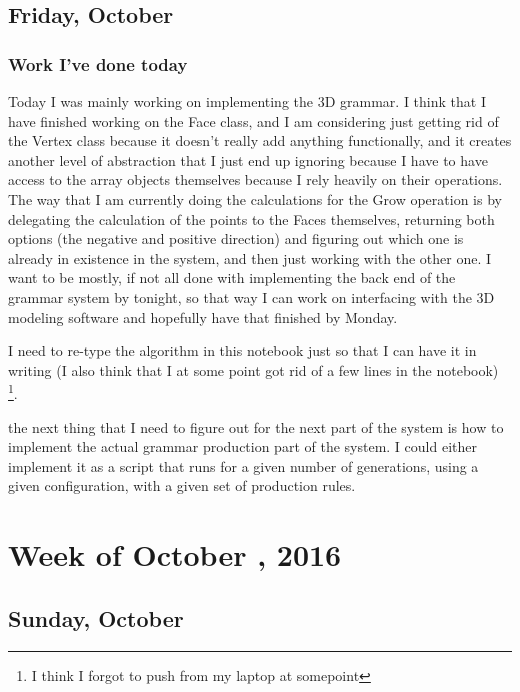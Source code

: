 \documentclass[letterpaper,oneside,titlepage]{article}
\begin{document}
\subsection{Friday, October }

\subsubsection{Work I've done today}
Today I was mainly working on implementing the 3D grammar.  I think that I have finished working on the Face class, and I am considering just getting rid of the Vertex class because it doesn't really add anything functionally, and it creates another level of abstraction that I just end up ignoring because I have to have access to the array objects themselves because I rely heavily on their operations.  The way that I am currently doing the calculations for the Grow operation is by delegating the calculation of the points to the Faces themselves, returning both options (the negative and positive direction) and figuring out which one is already in existence in the system, and then just working with the other one.  I want to be mostly, if not all done with implementing the back end of the grammar system by tonight, so that way I can work on interfacing with the 3D modeling software and hopefully have that finished by Monday.
\par
I need to re-type the algorithm in this notebook just so that I can have it in writing (I also think that I at some point got rid of a few lines in the notebook) \footnote{I think I forgot to push from my laptop at somepoint}.
\par
the next thing that I need to figure out for the next part of the system is how to implement the actual grammar production part of the system.  I could either implement it as a script that runs for a given number of generations, using a given configuration, with a given set of production rules.



\section{Week of October , 2016}

\subsection{Sunday, October }
\end{document}
